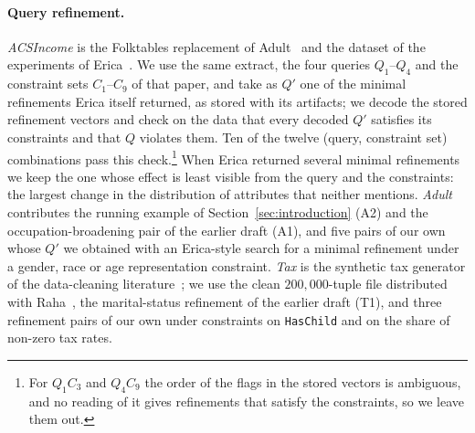 \paragraph{Query refinement.}
\emph{ACSIncome} is the Folktables replacement of Adult~\cite{DingHMS21} and the dataset of the experiments of Erica~\cite{LMSJ23,ERICA}.
We use the same extract, the four queries $Q_1$--$Q_4$ and the constraint sets $C_1$--$C_9$ of that paper, and take as $Q'$ one of the minimal refinements Erica itself returned, as stored with its artifacts; we decode the stored refinement vectors and check on the data that every decoded $Q'$ satisfies its constraints and that $Q$ violates them.
Ten of the twelve (query, constraint set) combinations pass this check.\footnote{For $Q_1C_3$ and $Q_4C_9$ the order of the flags in the stored vectors is ambiguous, and no reading of it gives refinements that satisfy the constraints, so we leave them out.}
When Erica returned several minimal refinements we keep the one whose effect is least visible from the query and the constraints: the largest change in the distribution of attributes that neither mentions.
\emph{Adult} contributes the running example of Section~\ref{sec:introduction} (A2) and the occupation-broadening pair of the earlier draft (A1), and five pairs of our own whose $Q'$ we obtained with an Erica-style search for a minimal refinement under a gender, race or age representation constraint.
\emph{Tax} is the synthetic tax generator of the data-cleaning literature~\cite{BohannonFGJK07}; we use the clean $200{,}000$-tuple file distributed with Raha~\cite{MahdaviAFMOST19}, the marital-status refinement of the earlier draft (T1), and three refinement pairs of our own under constraints on \texttt{HasChild} and on the share of non-zero tax rates.

